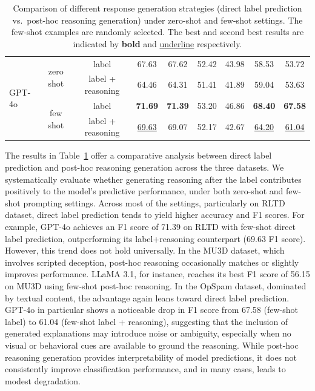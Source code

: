 \begin{table}[ht]
\begin{tabular}{l c c cc cc cc}
\multirow{4}{*}{GPT-4o} 
 & \multirow{2}{*}{zero shot}
   & label 
     & 67.63 & 67.62 
     & 52.42 & 43.98
     & 58.53 & 53.72 \\
 & 
   & label + reasoning
     & 64.46 & 64.31
     & 51.41 & 41.89 
     & 59.04 & 53.63\\
\cmidrule(lr){2-9}
 & \multirow{2}{*}{few shot}
   & label
     & \textbf{71.69} & \textbf{71.39} 
     & 53.20 & 46.86 
     & \textbf{68.40} & \textbf{67.58} \\
 &
   & label + reasoning
     & \underline{69.63} & 69.07 
     & 52.17 & 42.67
     & \underline{64.20} &  \underline{61.04}\\
\bottomrule
\end{tabular}
\caption{Comparison of different response generation strategies (direct label prediction vs.\ post-hoc reasoning generation) under zero-shot and few-shot settings. The few-shot examples are randomly selected. The best and second best results are indicated by \textbf{bold} and \underline{underline} respectively.}
\label{tab:response_generation_shots}
\end{table}

The results in Table~\ref{tab:response_generation_shots} offer a comparative analysis between direct label prediction and post-hoc reasoning generation across the three datasets. We systematically evaluate whether generating reasoning after the label contributes positively to the model’s predictive performance, under both zero-shot and few-shot prompting settings. Across most of the settings, particularly on RLTD dataset, direct label prediction tends to yield higher accuracy and F1 scores. For example, GPT-4o achieves an F1 score of 71.39 on RLTD with few-shot direct label prediction, outperforming its label+reasoning counterpart (69.63 F1 score). However, this trend does not hold universally. In the MU3D dataset, which involves scripted deception, post-hoc reasoning occasionally matches or slightly improves performance. LLaMA 3.1, for instance, reaches its best F1 score of 56.15 on MU3D using few-shot post-hoc reasoning. In the OpSpam dataset, dominated by textual content, the advantage again leans toward direct label prediction. GPT-4o in particular shows a noticeable drop in F1 score from 67.58 (few-shot label) to 61.04 (few-shot label + reasoning), suggesting that the inclusion of generated explanations may introduce noise or ambiguity, especially when no visual or behavioral cues are available to ground the reasoning. While post-hoc reasoning generation provides interpretability of model predictions, it does not consistently improve classification performance, and in many cases, leads to modest degradation. 

